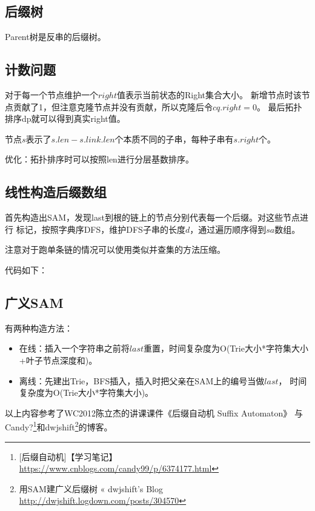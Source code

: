\subsection{后缀树}
Parent树是反串的后缀树。
\subsection{计数问题}
对于每一个节点维护一个$right$值表示当前状态的Right集合大小。
新增节点时该节点贡献了1，但注意克隆节点并没有贡献，所以克隆后令$cq.right=0$。
最后拓扑排序dp就可以得到真实right值。

节点$s$表示了$s.len-s.link.len$个本质不同的子串，每种子串有$s.right$个。

优化：拓扑排序时可以按照len进行分层基数排序。
\subsection{线性构造后缀数组}
首先构造出SAM，发现last到根的链上的节点分别代表每一个后缀。对这些节点进行
标记，按照字典序DFS，维护DFS子串的长度$d$，通过遍历顺序得到$sa$数组。

注意对于跑单条链的情况可以使用类似并查集的方法压缩。

代码如下：

\subsection{广义SAM}
有两种构造方法：
\begin{itemize}
    \item 在线：插入一个字符串之前将$last$重置，时间复杂度为O(Trie大小*字符集大小
    +叶子节点深度和)。
    \item 离线：先建出Trie，BFS插入，插入时把父亲在SAM上的编号当做$last$，
    时间复杂度为O(Trie大小*字符集大小)。
\end{itemize}

以上内容参考了WC2012陈立杰的讲课课件《后缀自动机 Suffix Automaton》
与Candy?\footnote{[后缀自动机]【学习笔记】
    \url{https://www.cnblogs.com/candy99/p/6374177.html}
}和dwjshift\footnote{
    用SAM建广义后缀树 « dwjshift's Blog
    \url{http://dwjshift.logdown.com/posts/304570}
}的博客。
